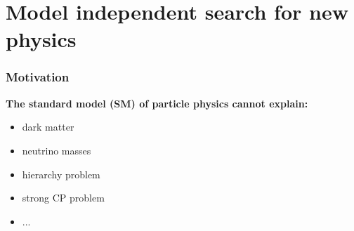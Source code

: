 \documentclass[english]{beamer}
\newcommand{\slide}[2][t]{\begin{frame}[#1] \frametitle{\insertsection} #2 \end{frame}}
\newcommand{\red}[1]{\textcolor{red}{#1}}
\begin{document}

\renewcommand{\slide}[2][t]{\begin{frame}[#1] \frametitle{\insertsubsectionhead} #2 \end{frame}}

\section{Model independent search for new physics}

\begin{frame}
\frametitle{\insertsectionhead}
\tableofcontents[currentsection]
\end{frame}

\slide[c]{

    \frametitle{Motivation}

    {\large\textbf{The standard model (SM) of particle physics cannot explain:}}

    \begin{itemize}

        \item dark matter
        \item neutrino masses
        \item hierarchy problem %
        \item strong CP problem
        \item ...

    \end{itemize}

    \vspace{5mm}

    \begin{center}
        \uncover<2->{ {\Huge \red{new physics (NP) required}} } \\
        \uncover<3->{ {\large \red{exact structure unknown $\Rightarrow$ model independent analysis}} }
    \end{center}

}
\end{document}
